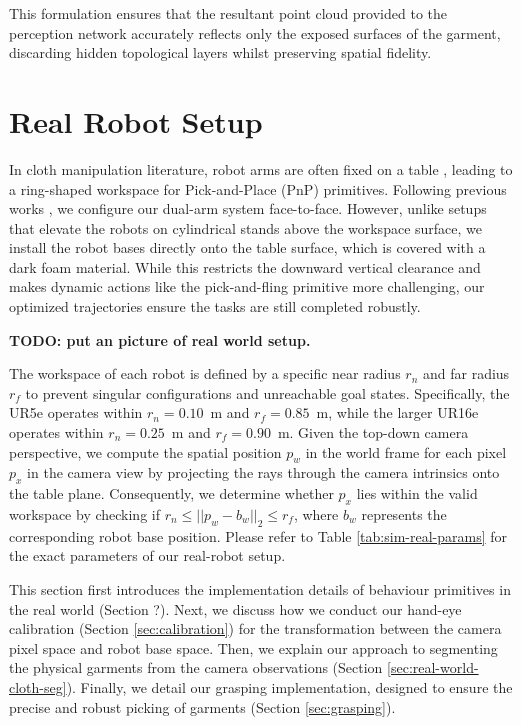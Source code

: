 \documentclass[journal]{IEEEtran}
\begin{document}
This formulation ensures that the resultant point cloud provided to the perception network accurately reflects only the exposed surfaces of the garment, discarding hidden topological layers whilst preserving spatial fidelity.

\section{Real Robot Setup} \label{sec:real-world-setup}

In cloth manipulation literature, robot arms are often fixed on a table \cite{lin2022learning,canberk2022cloth}, leading to a ring-shaped workspace for Pick-and-Place (PnP) primitives. Following previous works \cite{luo2025clothmate, canberk2022cloth}, we configure our dual-arm system face-to-face. However, unlike setups that elevate the robots on cylindrical stands above the workspace surface, we install the robot bases directly onto the table surface, which is covered with a dark foam material. While this restricts the downward vertical clearance and makes dynamic actions like the pick-and-fling primitive more challenging, our optimized trajectories ensure the tasks are still completed robustly.

\textbf{TODO: put an picture of real world setup.}



The workspace of each robot is defined by a specific near radius $r_{n}$ and far radius $r_{f}$ to prevent singular configurations and unreachable goal states. Specifically, the UR5e operates within $r_n = 0.10$~m and $r_f = 0.85$~m, while the larger UR16e operates within $r_n = 0.25$~m and $r_f = 0.90$~m. Given the top-down camera perspective, we compute the spatial position $p_w$ in the world frame for each pixel $p_x$ in the camera view by projecting the rays through the camera intrinsics onto the table plane. Consequently, we determine whether $p_x$ lies within the valid workspace by checking if $r_n \leq ||p_w - b_w||_2 \leq r_f$, where $b_w$ represents the corresponding robot base position. Please refer to Table \ref{tab:sim-real-params} for the exact parameters of our real-robot setup.

This section first introduces the implementation details of behaviour primitives in the real world (Section ?). Next, we discuss how we conduct our hand-eye calibration (Section \ref{sec:calibration}) for the transformation between the camera pixel space and robot base space. Then, we explain our approach to segmenting the physical garments from the camera observations (Section \ref{sec:real-world-cloth-seg}). Finally, we detail our grasping implementation, designed to ensure the precise and robust picking of garments (Section \ref{sec:grasping}).
\end{document}
